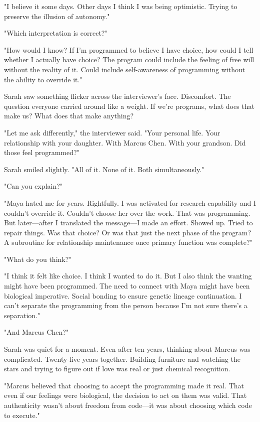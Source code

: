 "I believe it some days. Other days I think I was being optimistic. Trying to preserve the illusion of autonomy."

"Which interpretation is correct?"

"How would I know? If I'm programmed to believe I have choice, how could I tell whether I actually have choice? The program could include the feeling of free will without the reality of it. Could include self-awareness of programming without the ability to override it."

Sarah saw something flicker across the interviewer's face. Discomfort. The question everyone carried around like a weight. If we're programs, what does that make us? What does that make anything?

"Let me ask differently," the interviewer said. "Your personal life. Your relationship with your daughter. With Marcus Chen. With your grandson. Did those feel programmed?"

Sarah smiled slightly. "All of it. None of it. Both simultaneously."

"Can you explain?"

"Maya hated me for years. Rightfully. I was activated for research capability and I couldn't override it. Couldn't choose her over the work. That was programming. But later—after I translated the message—I made an effort. Showed up. Tried to repair things. Was that choice? Or was that just the next phase of the program? A subroutine for relationship maintenance once primary function was complete?"

"What do you think?"

"I think it felt like choice. I think I wanted to do it. But I also think the wanting might have been programmed. The need to connect with Maya might have been biological imperative. Social bonding to ensure genetic lineage continuation. I can't separate the programming from the person because I'm not sure there's a separation."

"And Marcus Chen?"

Sarah was quiet for a moment. Even after ten years, thinking about Marcus was complicated. Twenty-five years together. Building furniture and watching the stars and trying to figure out if love was real or just chemical recognition.

"Marcus believed that choosing to accept the programming made it real. That even if our feelings were biological, the decision to act on them was valid. That authenticity wasn't about freedom from code—it was about choosing which code to execute."


